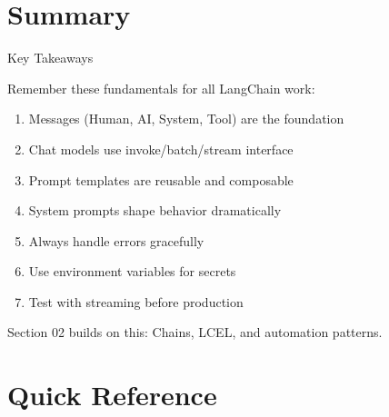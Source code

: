 \documentclass[aspectratio=169,11pt]{beamer}
\begin{document}
\section{Summary}

\begin{frame}{Key Takeaways}
  \begin{conceptbox}
    Remember these fundamentals for all LangChain work:
  \end{conceptbox}

  \begin{enumerate}
    \setlength{\itemsep}{1pt}
    \item Messages (Human, AI, System, Tool) are the foundation
    \item Chat models use invoke/batch/stream interface
    \item Prompt templates are reusable and composable
    \item System prompts shape behavior dramatically
    \item Always handle errors gracefully
    \item Use environment variables for secrets
    \item Test with streaming before production
  \end{enumerate}

  \vspace{0.4cm}
  \begin{tipbox}
    Section 02 builds on this: Chains, LCEL, and automation patterns.
  \end{tipbox}
\end{frame}

\section{Quick Reference}
\end{document}
